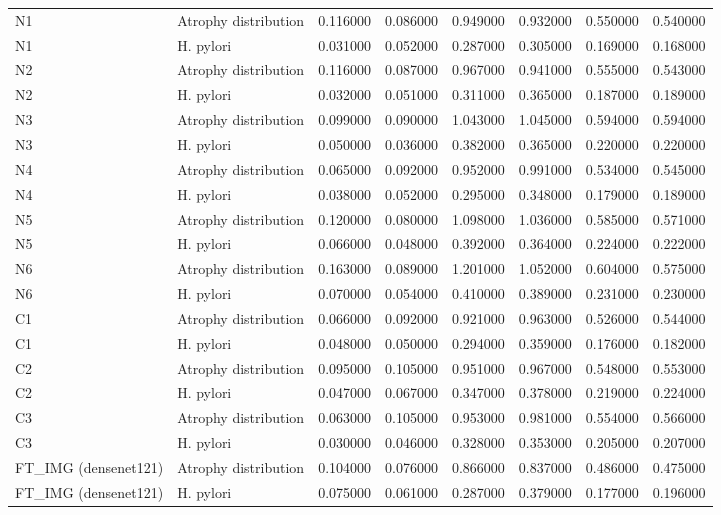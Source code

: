 \begin{table}
\begin{tabular}{llrrrrrr}
N1 & Atrophy distribution & 0.116000 & 0.086000 & 0.949000 & 0.932000 & 0.550000 & 0.540000 \\
N1 & H. pylori & 0.031000 & 0.052000 & 0.287000 & 0.305000 & 0.169000 & 0.168000 \\
N2 & Atrophy distribution & 0.116000 & 0.087000 & 0.967000 & 0.941000 & 0.555000 & 0.543000 \\
N2 & H. pylori & 0.032000 & 0.051000 & 0.311000 & 0.365000 & 0.187000 & 0.189000 \\
N3 & Atrophy distribution & 0.099000 & 0.090000 & 1.043000 & 1.045000 & 0.594000 & 0.594000 \\
N3 & H. pylori & 0.050000 & 0.036000 & 0.382000 & 0.365000 & 0.220000 & 0.220000 \\
N4 & Atrophy distribution & 0.065000 & 0.092000 & 0.952000 & 0.991000 & 0.534000 & 0.545000 \\
N4 & H. pylori & 0.038000 & 0.052000 & 0.295000 & 0.348000 & 0.179000 & 0.189000 \\
N5 & Atrophy distribution & 0.120000 & 0.080000 & 1.098000 & 1.036000 & 0.585000 & 0.571000 \\
N5 & H. pylori & 0.066000 & 0.048000 & 0.392000 & 0.364000 & 0.224000 & 0.222000 \\
N6 & Atrophy distribution & 0.163000 & 0.089000 & 1.201000 & 1.052000 & 0.604000 & 0.575000 \\
N6 & H. pylori & 0.070000 & 0.054000 & 0.410000 & 0.389000 & 0.231000 & 0.230000 \\
C1 & Atrophy distribution & 0.066000 & 0.092000 & 0.921000 & 0.963000 & 0.526000 & 0.544000 \\
C1 & H. pylori & 0.048000 & 0.050000 & 0.294000 & 0.359000 & 0.176000 & 0.182000 \\
C2 & Atrophy distribution & 0.095000 & 0.105000 & 0.951000 & 0.967000 & 0.548000 & 0.553000 \\
C2 & H. pylori & 0.047000 & 0.067000 & 0.347000 & 0.378000 & 0.219000 & 0.224000 \\
C3 & Atrophy distribution & 0.063000 & 0.105000 & 0.953000 & 0.981000 & 0.554000 & 0.566000 \\
C3 & H. pylori & 0.030000 & 0.046000 & 0.328000 & 0.353000 & 0.205000 & 0.207000 \\
FT\_IMG (densenet121) & Atrophy distribution & 0.104000 & 0.076000 & 0.866000 & 0.837000 & 0.486000 & 0.475000 \\
FT\_IMG (densenet121) & H. pylori & 0.075000 & 0.061000 & 0.287000 & 0.379000 & 0.177000 & 0.196000 \\

\end{tabular}
\end{table}
